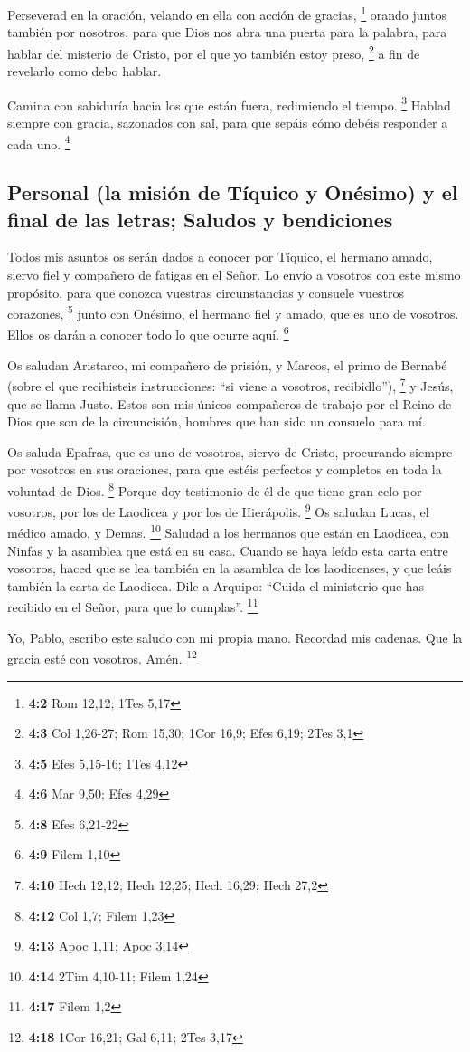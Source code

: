  Perseverad en la oración, velando en ella con acción de
gracias, \footnote{\textbf{4:2} Rom 12,12; 1Tes 5,17} 
orando juntos también por nosotros, para que Dios nos abra una puerta
para la palabra, para hablar del misterio de Cristo, por el que yo
también estoy preso, \footnote{\textbf{4:3} Col 1,26-27; Rom 15,30; 1Cor
  16,9; Efes 6,19; 2Tes 3,1}  a fin de revelarlo como debo
hablar.

 Camina con sabiduría hacia los que están fuera,
redimiendo el tiempo. \footnote{\textbf{4:5} Efes 5,15-16; 1Tes 4,12}
 Hablad siempre con gracia, sazonados con sal, para que
sepáis cómo debéis responder a cada uno. \footnote{\textbf{4:6} Mar
  9,50; Efes 4,29}

\hypertarget{personal-la-misiuxf3n-de-tuxedquico-y-onuxe9simo-y-el-final-de-las-letras-saludos-y-bendiciones}{%
\subsection{Personal (la misión de Tíquico y Onésimo) y el final de las
letras; Saludos y
bendiciones}\label{personal-la-misiuxf3n-de-tuxedquico-y-onuxe9simo-y-el-final-de-las-letras-saludos-y-bendiciones}}

 Todos mis asuntos os serán dados a conocer por Tíquico,
el hermano amado, siervo fiel y compañero de fatigas en el Señor.
 Lo envío a vosotros con este mismo propósito, para que
conozca vuestras circunstancias y consuele vuestros corazones,
\footnote{\textbf{4:8} Efes 6,21-22}  junto con Onésimo,
el hermano fiel y amado, que es uno de vosotros. Ellos os darán a
conocer todo lo que ocurre aquí. \footnote{\textbf{4:9} Filem 1,10}

 Os saludan Aristarco, mi compañero de prisión, y Marcos,
el primo de Bernabé (sobre el que recibisteis instrucciones: ``si viene
a vosotros, recibidlo''), \footnote{\textbf{4:10} Hech 12,12; Hech
  12,25; Hech 16,29; Hech 27,2}  y Jesús, que se llama
Justo. Estos son mis únicos compañeros de trabajo por el Reino de Dios
que son de la circuncisión, hombres que han sido un consuelo para mí.

 Os saluda Epafras, que es uno de vosotros, siervo de
Cristo, procurando siempre por vosotros en sus oraciones, para que
estéis perfectos y completos en toda la voluntad de Dios. \footnote{\textbf{4:12}
  Col 1,7; Filem 1,23}  Porque doy testimonio de él de
que tiene gran celo por vosotros, por los de Laodicea y por los de
Hierápolis. \footnote{\textbf{4:13} Apoc 1,11; Apoc 3,14}
 Os saludan Lucas, el médico amado, y Demas. \footnote{\textbf{4:14}
  2Tim 4,10-11; Filem 1,24}  Saludad a los hermanos que
están en Laodicea, con Ninfas y la asamblea que está en su casa.
 Cuando se haya leído esta carta entre vosotros, haced
que se lea también en la asamblea de los laodicenses, y que leáis
también la carta de Laodicea.  Dile a Arquipo: ``Cuida el
ministerio que has recibido en el Señor, para que lo cumplas''.
\footnote{\textbf{4:17} Filem 1,2}

 Yo, Pablo, escribo este saludo con mi propia mano.
Recordad mis cadenas. Que la gracia esté con vosotros. Amén. \footnote{\textbf{4:18}
  1Cor 16,21; Gal 6,11; 2Tes 3,17}
